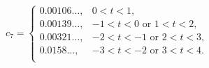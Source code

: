 \[c_{7}=\begin{cases}0.00106\ldots,&0<t<1,\\
0.00139\ldots,&-1<t<0\mbox{ or }1<t<2,\\
0.00321\ldots,&-2<t<-1\mbox{ or }2<t<3,\\
0.0158\ldots,&-3<t<-2\mbox{ or }3<t<4.\\
\end{cases}\]